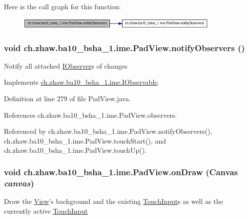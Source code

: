 Here is the call graph for this function:\nopagebreak
\begin{figure}[H]
\begin{center}
\leavevmode
\includegraphics[width=284pt]{classch_1_1zhaw_1_1ba10__bsha__1_1_1ime_1_1PadView_aa3a0e6aedfc80225bf47ce3cce17db27_cgraph}
\end{center}
\end{figure}
\hypertarget{classch_1_1zhaw_1_1ba10__bsha__1_1_1ime_1_1PadView_a1516c15d8011caccf368c5d709f19e01}{
\subsubsection[{notifyObservers}]{\setlength{\rightskip}{0pt plus 5cm}void ch.zhaw.ba10\_\-bsha\_\-1.ime.PadView.notifyObservers ()}}
\label{classch_1_1zhaw_1_1ba10__bsha__1_1_1ime_1_1PadView_a1516c15d8011caccf368c5d709f19e01}
Notify all attached \hyperlink{interfacech_1_1zhaw_1_1ba10__bsha__1_1_1ime_1_1IObserver}{IObserver}s of changes 

Implements \hyperlink{interfacech_1_1zhaw_1_1ba10__bsha__1_1_1ime_1_1IObservable_ade6befac243ff61d162ba09d6ff2e31d}{ch.zhaw.ba10\_\-bsha\_\-1.ime.IObservable}.

Definition at line 279 of file PadView.java.

References ch.zhaw.ba10\_\-bsha\_\-1.ime.PadView.observers.

Referenced by ch.zhaw.ba10\_\-bsha\_\-1.ime.PadView.notifyObservers(), ch.zhaw.ba10\_\-bsha\_\-1.ime.PadView.touchStart(), and ch.zhaw.ba10\_\-bsha\_\-1.ime.PadView.touchUp().\hypertarget{classch_1_1zhaw_1_1ba10__bsha__1_1_1ime_1_1PadView_ac3129d73ee224efd3cd031971c810818}{
\subsubsection[{onDraw}]{\setlength{\rightskip}{0pt plus 5cm}void ch.zhaw.ba10\_\-bsha\_\-1.ime.PadView.onDraw (Canvas {\em canvas})}}
\label{classch_1_1zhaw_1_1ba10__bsha__1_1_1ime_1_1PadView_ac3129d73ee224efd3cd031971c810818}
Draw the \hyperlink{}{View}'s background and the existing \hyperlink{classch_1_1zhaw_1_1ba10__bsha__1_1_1ime_1_1TouchInput}{TouchInput}s as well as the currently active \hyperlink{classch_1_1zhaw_1_1ba10__bsha__1_1_1ime_1_1TouchInput}{TouchInput} 

